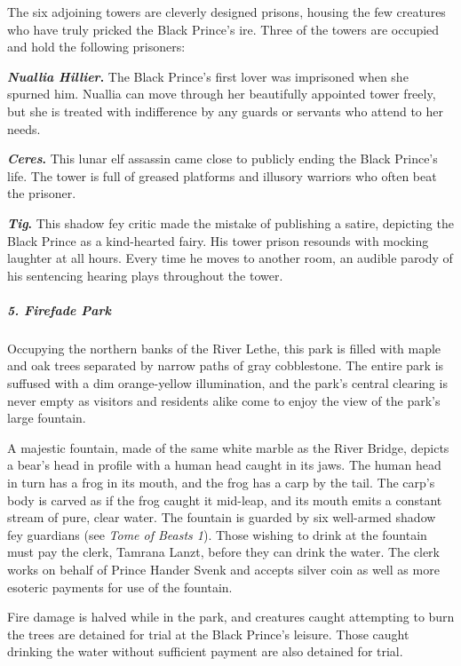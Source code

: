 \documentclass[10pt,a4paper,twoside,bg=print,twocolumn,openany,nodeprecatedcode]{dndbook}
\begin{document}
The six adjoining towers are cleverly designed prisons, housing the few creatures who have truly pricked the Black Prince's ire. Three of the towers are occupied and hold the following prisoners:


\begin{description}
\item \textbf{\textit{Nuallia Hillier}.} The Black Prince's first lover was imprisoned when she spurned him. Nuallia can move through her beautifully appointed tower freely, but she is treated with indifference by any guards or servants who attend to her needs.
\item \textbf{\textit{Ceres}.} This lunar elf assassin came close to publicly ending the Black Prince's life. The tower is full of greased platforms and illusory warriors who often beat the prisoner.
\item \textbf{\textit{Tig}.} This shadow fey critic made the mistake of publishing a satire, depicting the Black Prince as a kind-hearted fairy. His tower prison resounds with mocking laughter at all hours. Every time he moves to another room, an audible parody of his sentencing hearing plays throughout the tower.
\end{description}

\subparagraph{5. Firefade Park}
Occupying the northern banks of the River Lethe, this park is filled with maple and oak trees separated by narrow paths of gray cobblestone. The entire park is suffused with a dim orange-yellow illumination, and the park's central clearing is never empty as visitors and residents alike come to enjoy the view of the park's large fountain.

A majestic fountain, made of the same white marble as the River Bridge, depicts a bear's head in profile with a human head caught in its jaws. The human head in turn has a frog in its mouth, and the frog has a carp by the tail. The carp's body is carved as if the frog caught it mid-leap, and its mouth emits a constant stream of pure, clear water. The fountain is guarded by six well-armed shadow fey guardians (see \textit{Tome of Beasts 1}). Those wishing to drink at the fountain must pay the clerk, Tamrana Lanzt, before they can drink the water. The clerk works on behalf of Prince Hander Svenk and accepts silver coin as well as more esoteric payments for use of the fountain.

Fire damage is halved while in the park, and creatures caught attempting to burn the trees are detained for trial at the Black Prince's leisure. Those caught drinking the water without sufficient payment are also detained for trial.
\end{document}
